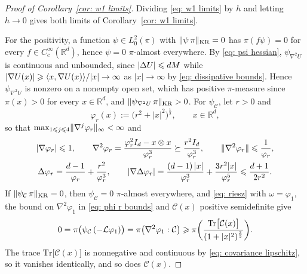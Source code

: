 \begin{proof}[Proof of Corollary~\ref{cor: w1 limits}]
    Dividing \eqref{eq: w1 limits} by $h$ and letting $h \to 0$ gives both limits of Corollary~\ref{cor: w1 limits}.

    For the positivity, a function $\psi \in L^2_0(\pi)$ with $\lVert \psi\, \pi \rVert_{\mathrm{KR}} = 0$ has $\pi(f \psi) = 0$ for every $f \in C_c^\infty(\mathbb R^d)$, hence $\psi = 0$ $\pi$-almost everywhere. By \eqref{eq: psi hessian}, $\psi_{\nabla^2 U}$ is continuous and unbounded, since $|\Delta U| \leqslant d M$ while $|\nabla U(x)| \geqslant \langle x, \nabla U(x) \rangle / |x| \to \infty$ as $|x| \to \infty$ by \eqref{eq: dissipative bounds}. Hence $\psi_{\nabla^2 U}$ is nonzero on a nonempty open set, which has positive $\pi$-measure since $\pi(x) > 0$ for every $x \in \mathbb R^d$, and $\lVert \psi_{\nabla^2 U}\, \pi \rVert_{\mathrm{KR}} > 0$. For $\psi_{\mathcal C}$, let $r > 0$ and
    \begin{equation}
        \varphi_r(x) := \bigl( r^2 + |x|^2 \bigr)^{\frac12} , \qquad x \in \mathbb R^d ,
        \label{eq: phi r}
    \end{equation}
    so that $\max_{1 \leqslant j \leqslant 4} \lVert \nabla^j \varphi_r \rVert_\infty < \infty$ and
    \begin{equation}
    \begin{gathered}
        |\nabla \varphi_r| \leqslant 1 , \qquad \nabla^2 \varphi_r = \frac{\varphi_r^2 I_d - x \otimes x}{\varphi_r^3} \succeq \frac{r^2 I_d}{\varphi_r^3} , \qquad \lVert \nabla^2 \varphi_r \rVert \leqslant \frac{1}{\varphi_r} , \\
        \Delta \varphi_r = \frac{d-1}{\varphi_r} + \frac{r^2}{\varphi_r^3} , \qquad |\nabla \Delta \varphi_r| = \frac{(d-1)\, |x|}{\varphi_r^3} + \frac{3 r^2 |x|}{\varphi_r^5} \leqslant \frac{d+1}{2 r^2} .
    \end{gathered}
        \label{eq: phi r bounds}
    \end{equation}
    If $\lVert \psi_{\mathcal C}\, \pi \rVert_{\mathrm{KR}} = 0$, then $\psi_{\mathcal C} = 0$ $\pi$-almost everywhere, and \eqref{eq: riesz} with $\omega = \varphi_1$, the bound on $\nabla^2 \varphi_1$ in \eqref{eq: phi r bounds} and $\mathcal C(x)$ positive semidefinite give
    \begin{equation*}
        0 = \pi\bigl( \psi_{\mathcal C}\, (-\mathcal L \varphi_1) \bigr) = \pi\bigl( \nabla^2 \varphi_1 : \mathcal C \bigr) \geqslant \pi\biggl( \frac{\mathrm{Tr}\bigl[ \mathcal C(x) \bigr]}{(1 + |x|^2)^{\frac32}} \biggr) .
    \end{equation*}
    The trace $\mathrm{Tr}\bigl[ \mathcal C(x) \bigr]$ is nonnegative and continuous by \eqref{eq: covariance lipschitz}, so it vanishes identically, and so does $\mathcal C(x)$.
\end{proof}


